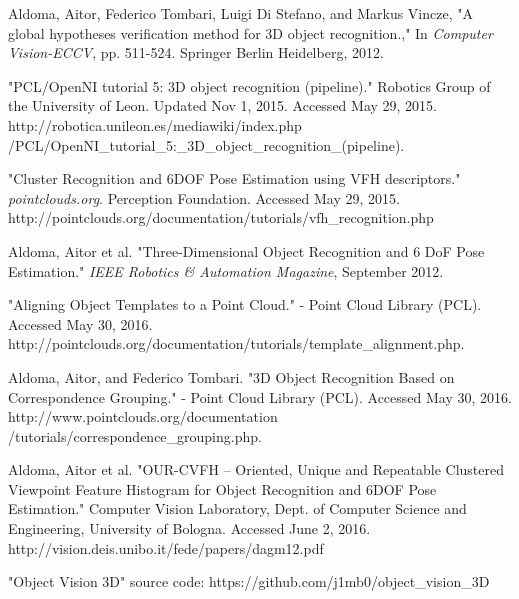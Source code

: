 \documentclass[journal]{IEEEtran}
\begin{document}
\begin{thebibliography}{1}

Aldoma, Aitor, Federico Tombari, Luigi Di Stefano, and Markus Vincze, "A global hypotheses verification method for 3D object recognition.," In \emph{Computer Vision-ECCV}, pp. 511-524. Springer Berlin Heidelberg, 2012.


"PCL/OpenNI tutorial 5: 3D object recognition (pipeline)." Robotics Group of the University of Leon.  Updated Nov 1, 2015.  Accessed May 29, 2015.  http://robotica.unileon.es/mediawiki/index.php \\ /PCL/OpenNI\_tutorial\_5:\_3D\_object\_recognition\_(pipeline).


"Cluster Recognition and 6DOF Pose Estimation using VFH descriptors." \emph{pointclouds.org}.  Perception Foundation.
Accessed May 29, 2015. http://pointclouds.org/documentation/tutorials/vfh\_recognition.php


Aldoma, Aitor et al.  "Three-Dimensional Object Recognition and 6 DoF Pose Estimation." \emph{IEEE Robotics \& Automation Magazine}, September 2012.

"Aligning Object Templates to a Point Cloud." - Point Cloud Library (PCL).  Accessed May 30, 2016.  http://pointclouds.org/documentation/tutorials/template\_alignment.php.

Aldoma, Aitor, and Federico Tombari. "3D Object Recognition Based on Correspondence Grouping." - Point Cloud Library (PCL). Accessed May 30, 2016. http://www.pointclouds.org/documentation \\ /tutorials/correspondence\_grouping.php. 

Aldoma, Aitor et al. "OUR-CVFH – Oriented, Unique and Repeatable Clustered Viewpoint Feature Histogram for Object Recognition and 6DOF Pose Estimation."  Computer Vision Laboratory, Dept. of Computer Science and Engineering, University of Bologna.  Accessed June 2, 2016.  http://vision.deis.unibo.it/fede/papers/dagm12.pdf


"Object Vision 3D" source code: https://github.com/j1mb0/object\_vision\_3D
\end{thebibliography}






\end{document}
